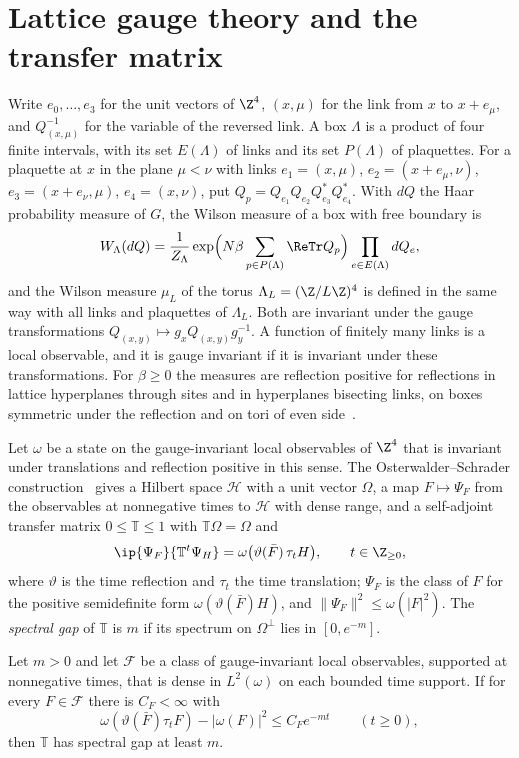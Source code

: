 
\section{Lattice gauge theory and the transfer matrix}\label{sec:lattice}

Write $e_0,\dots,e_3$ for the unit vectors of $\Z^4$, $(x,\mu)$ for the link
from $x$ to $x+e_\mu$, and $Q_{(x,\mu)}^{-1}$ for the variable of the reversed
link. A box $\Lambda$ is a product of four finite intervals, with its set
$E(\Lambda)$ of links and its set $P(\Lambda)$ of plaquettes. For a plaquette
at $x$ in the plane $\mu<\nu$ with links $e_1=(x,\mu)$, $e_2=(x+e_\mu,\nu)$,
$e_3=(x+e_\nu,\mu)$, $e_4=(x,\nu)$, put $Q_p=Q_{e_1}Q_{e_2}Q_{e_3}^*Q_{e_4}^*$.
With $dQ$ the Haar probability measure of $G$, the Wilson measure of a box
with free boundary is
\[
W_\Lambda(dQ)=\frac1{Z_\Lambda}\exp\Bigl(N\beta\sum_{p\in P(\Lambda)}\ReTr
Q_p\Bigr)\prod_{e\in E(\Lambda)}dQ_e ,
\]
and the Wilson measure $\mu_L$ of the torus $\Lambda_L=(\Z/L\Z)^4$ is defined
in the same way with all links and plaquettes of $\Lambda_L$. Both are
invariant under the gauge transformations $Q_{(x,y)}\mapsto g_xQ_{(x,y)}
g_y^{-1}$. A function of finitely many links is a local observable, and it
is gauge invariant if it is invariant under these transformations. For
$\beta\ge0$ the measures are reflection positive for reflections in lattice
hyperplanes through sites and in hyperplanes bisecting links, on boxes
symmetric under the reflection and on tori of even side~\cite{OSei78}.

Let $\omega$ be a state on the gauge-invariant local observables of $\Z^4$
that is invariant under translations and reflection positive in this sense.
The Osterwalder--Schrader construction~\cite{OS73,OS75,OSei78} gives a
Hilbert space $\mathcal H$ with a unit vector $\Omega$, a map $F\mapsto\Psi_F$
from the observables at nonnegative times to $\mathcal H$ with dense range,
and a self-adjoint transfer matrix $0\le\mathbb T\le1$ with $\mathbb T\Omega=
\Omega$ and
\[
\ip{\Psi_F}{\mathbb T^t\Psi_H}=\omega\bigl(\vartheta(\bar F)\,\tau_tH\bigr),
\qquad t\in\Z_{\ge0},
\]
where $\vartheta$ is the time reflection and $\tau_t$ the time translation;
$\Psi_F$ is the class of $F$ for the positive semidefinite form
$\omega(\vartheta(\bar F)H)$, and $\|\Psi_F\|^2\le\omega(|F|^2)$. The
\emph{spectral gap} of $\mathbb T$ is $m$ if its spectrum on $\Omega^\perp$
lies in $[0,e^{-m}]$.

\begin{proposition}\label{prop:gapdecay}
Let $m>0$ and let $\mathcal F$ be a class of gauge-invariant local
observables, supported at nonnegative times, that is dense in $L^2(\omega)$
on each bounded time support. If for every $F\in\mathcal F$ there is
$C_F<\infty$ with
\[
\omega(\vartheta(\bar F)\tau_tF)-|\omega(F)|^2\le C_Fe^{-mt}\qquad(t\ge0),
\]
then $\mathbb T$ has spectral gap at least $m$.
\end{proposition}

